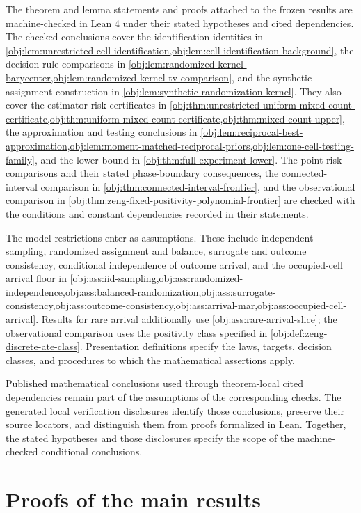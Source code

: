 \documentclass[11pt]{article}
\begin{document}
The theorem and lemma statements and proofs attached to the frozen results are machine-checked in Lean 4 under their stated hypotheses and cited dependencies. The checked conclusions cover the identification identities in \cref{obj:lem:unrestricted-cell-identification,obj:lem:cell-identification-background}, the decision-rule comparisons in \cref{obj:lem:randomized-kernel-barycenter,obj:lem:randomized-kernel-tv-comparison}, and the synthetic-assignment construction in \cref{obj:lem:synthetic-randomization-kernel}. They also cover the estimator risk certificates in \cref{obj:thm:unrestricted-uniform-mixed-count-certificate,obj:thm:uniform-mixed-count-certificate,obj:thm:mixed-count-upper}, the approximation and testing conclusions in \cref{obj:lem:reciprocal-best-approximation,obj:lem:moment-matched-reciprocal-priors,obj:lem:one-cell-testing-family}, and the lower bound in \cref{obj:thm:full-experiment-lower}. The point-risk comparisons and their stated phase-boundary consequences, the connected-interval comparison in \cref{obj:thm:connected-interval-frontier}, and the observational comparison in \cref{obj:thm:zeng-fixed-positivity-polynomial-frontier} are checked with the conditions and constant dependencies recorded in their statements.

The model restrictions enter as assumptions. These include independent sampling, randomized assignment and balance, surrogate and outcome consistency, conditional independence of outcome arrival, and the occupied-cell arrival floor in \cref{obj:ass:iid-sampling,obj:ass:randomized-independence,obj:ass:balanced-randomization,obj:ass:surrogate-consistency,obj:ass:outcome-consistency,obj:ass:arrival-mar,obj:ass:occupied-cell-arrival}. Results for rare arrival additionally use \cref{obj:ass:rare-arrival-slice}; the observational comparison uses the positivity class specified in \cref{obj:def:zeng-discrete-ate-class}. Presentation definitions specify the laws, targets, decision classes, and procedures to which the mathematical assertions apply.

Published mathematical conclusions used through theorem-local cited dependencies remain part of the assumptions of the corresponding checks. The generated local verification disclosures identify those conclusions, preserve their source locators, and distinguish them from proofs formalized in Lean. Together, the stated hypotheses and those disclosures specify the scope of the machine-checked conditional conclusions.


\section{Proofs of the main results}\label{sec:deferred-proofs}
\end{document}
